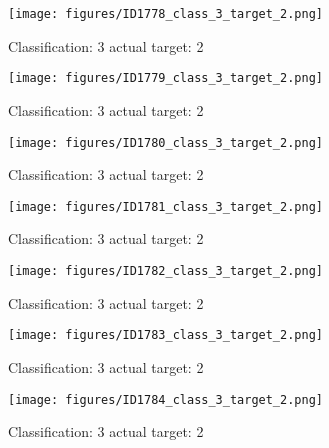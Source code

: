 \begin{figure}[h!]
\begin{center}
\texttt{[image: figures/ID1778\_class\_3\_target\_2.png]}
\end{center}
\caption{ Classification: 3 actual target: 2}
\label{fig:ID1778_class_3_target_2}
\end{figure}
\begin{figure}[h!]
\begin{center}
\texttt{[image: figures/ID1779\_class\_3\_target\_2.png]}
\end{center}
\caption{ Classification: 3 actual target: 2}
\label{fig:ID1779_class_3_target_2}
\end{figure}
\begin{figure}[h!]
\begin{center}
\texttt{[image: figures/ID1780\_class\_3\_target\_2.png]}
\end{center}
\caption{ Classification: 3 actual target: 2}
\label{fig:ID1780_class_3_target_2}
\end{figure}
\begin{figure}[h!]
\begin{center}
\texttt{[image: figures/ID1781\_class\_3\_target\_2.png]}
\end{center}
\caption{ Classification: 3 actual target: 2}
\label{fig:ID1781_class_3_target_2}
\end{figure}
\begin{figure}[h!]
\begin{center}
\texttt{[image: figures/ID1782\_class\_3\_target\_2.png]}
\end{center}
\caption{ Classification: 3 actual target: 2}
\label{fig:ID1782_class_3_target_2}
\end{figure}
\begin{figure}[h!]
\begin{center}
\texttt{[image: figures/ID1783\_class\_3\_target\_2.png]}
\end{center}
\caption{ Classification: 3 actual target: 2}
\label{fig:ID1783_class_3_target_2}
\end{figure}
\begin{figure}[h!]
\begin{center}
\texttt{[image: figures/ID1784\_class\_3\_target\_2.png]}
\end{center}
\caption{ Classification: 3 actual target: 2}
\label{fig:ID1784_class_3_target_2}
\end{figure}
